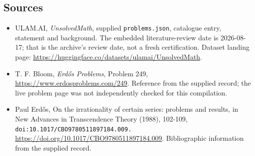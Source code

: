 \documentclass[11pt,a4paper]{article}
\begin{document}
\subsection{Sources}

{\small

\begin{itemize}

\item[\hypertarget{source:statement:1}{S1}] ULAM.AI, \emph{UnsolvedMath}, supplied \texttt{problems.json}, catalogue entry, statement and background. The embedded literature-review date is 2026-08-17; that is the archive’s review date, not a fresh certification. Dataset landing page: \url{https://huggingface.co/datasets/ulamai/UnsolvedMath}.

\item[\hypertarget{source:statement:2}{S2}] T. F. Bloom, \emph{Erdős Problems}, Problem 249, \url{https://www.erdosproblems.com/249}. Reference from the supplied record; the live problem page was not independently checked for this compilation.

\item[\hypertarget{source:statement:3}{S3}] Paul Erdős, On the irrationality of certain series: problems and results, in New Advances in Transcendence Theory (1988), 102-109, \nolinkurl{doi:10.1017/CBO9780511897184.009.} \url{https://doi.org/10.1017/CBO9780511897184.009}. Bibliographic information from the supplied record.

\end{itemize}

}

\label{end:statement}
\end{document}

